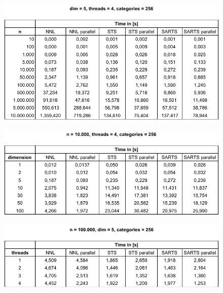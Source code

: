 \begin{figure}[H]
	\centering
	\includegraphics[width=1\linewidth]{figures/table-progressive-n}
	\label{fig:table-progressive-n}
\end{figure}

\begin{figure}[h]
	\centering
	\includegraphics[width=1\linewidth]{figures/table-progressive-dim}
	\label{fig:table-progressive-dim}
\end{figure}

\begin{figure}[h]
	\centering
	\includegraphics[width=1\linewidth]{figures/table-progressive-threads}
	\label{fig:table-progressive-threads}
\end{figure}


